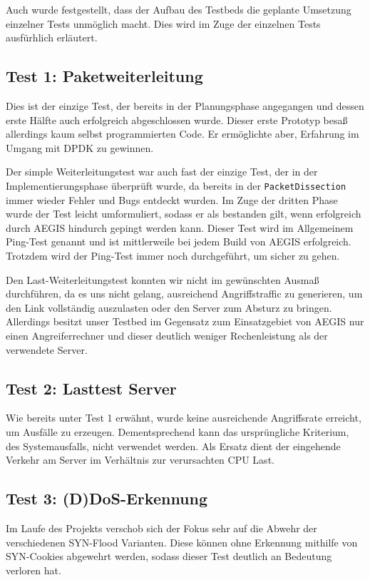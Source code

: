 \documentclass[../review_3.tex]{subfiles}
\begin{document}
	Auch wurde festgestellt, dass der Aufbau des Testbeds die geplante Umsetzung einzelner Tests unmöglich macht.
	Dies wird im Zuge der einzelnen Tests ausfürhlich erläutert.
	
\subsection{Test 1: Paketweiterleitung}
    Dies ist der einzige Test, der bereits in der Planungsphase angegangen und dessen erste Hälfte auch erfolgreich abgeschlossen wurde.
    Dieser erste Prototyp besaß allerdings kaum selbst programmierten Code.
    Er ermöglichte aber, Erfahrung im Umgang mit DPDK zu gewinnen.

    Der simple Weiterleitungstest war auch fast der einzige Test, der in der Implementierungsphase überprüft wurde, da bereits in der \texttt{PacketDissection} immer wieder Fehler und Bugs entdeckt wurden.
    Im Zuge der dritten Phase wurde der Test leicht umformuliert, sodass er als bestanden gilt, wenn erfolgreich durch AEGIS hindurch gepingt werden kann.
    Dieser Test wird im Allgemeinem Ping-Test genannt und ist mittlerweile bei jedem Build von AEGIS erfolgreich.
    Trotzdem wird der Ping-Test immer noch durchgeführt, um sicher zu gehen.

    Den Last-Weiterleitungstest konnten wir nicht im gewünschten Ausmaß durchführen, da es uns nicht gelang, ausreichend Angriffstraffic zu generieren, um den Link vollständig auszulasten oder den Server zum Absturz zu bringen.
    Allerdings besitzt unser Testbed im Gegensatz zum Einsatzgebiet von AEGIS nur einen Angreiferrechner und dieser deutlich weniger Rechenleistung als der verwendete Server.

\subsection{Test 2: Lasttest Server}
    Wie bereits unter Test 1 erwähnt, wurde keine ausreichende Angriffsrate erreicht, um Ausfälle zu erzeugen. 
    Dementsprechend kann das ursprüngliche Kriterium, des Systemausfalls, nicht verwendet werden.
    Als Ersatz dient der eingehende Verkehr am Server im Verhältnis zur verursachten CPU Last.

\subsection{Test 3: (D)DoS-Erkennung}
    Im Laufe des Projekts verschob sich der Fokus sehr auf die Abwehr der verschiedenen SYN-Flood Varianten.
    Diese können ohne Erkennung mithilfe von SYN-Cookies abgewehrt werden, sodass dieser Test deutlich an Bedeutung verloren hat.
    
\end{document}
